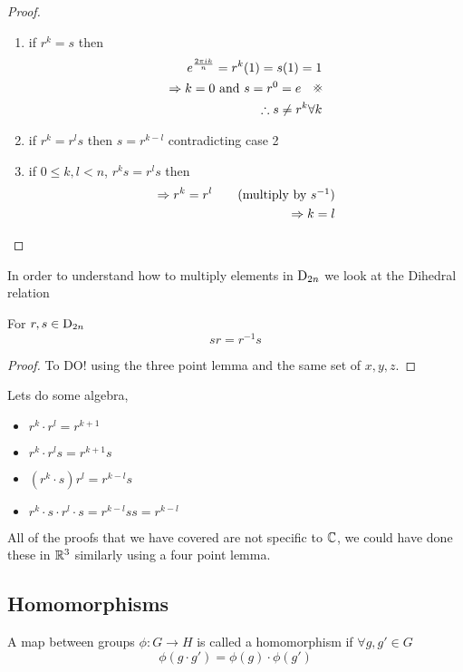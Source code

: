 \documentclass{article}
\begin{document}
\begin{proof}
\begin{enumerate}[cases]
        \item if $r^k = s$ then
        \begin{align*}
            e^\frac{2\pi i k}{n} = r^k(1) = s(1) = 1 \\
            \Rightarrow k = 0 \ \text{and} \ s = r^0 = e \quad \contradiction \\
            \therefore s \neq r^k \forall k
        \end{align*}

        \item if $r^k = r^ls$ then $s = r^{k-l}$ contradicting case 2
        \item if $0 \leq k, l < n$, $r^ks = r^ls$ then
        \begin{align*}
            \Rightarrow r^k = r^l \tag{multiply by $s^{-1}$} \\
            \Rightarrow k = l
        \end{align*}
    \end{enumerate}
\end{proof}

In order to understand how to multiply elements in $\mathrm{D}_{2n}$ we look at the Dihedral relation
\begin{lemma}
    For $r,s \in \mathrm{D}_{2n}$
    \[
        sr = r^{-1}s  
    \]
\end{lemma}

\begin{proof}
    To DO! using the three point lemma and the same set of ${x, y, z}$.
\end{proof}

\begin{eg}
    Lets do some algebra,
    \begin{itemize}
        \item $r^k \cdot r^l = r^{k + 1}$
        \item  $r^k \cdot r^ls = r^{k + 1}s$
        \item $(r^k \cdot s) r^l = r^{k - l}s$
        \item $r^k \cdot s \cdot r^l \cdot s= r^{k - l}ss = r^{k - l}$
    \end{itemize}
\end{eg}

All of the proofs that we have covered are not specific to $\mathbb{C}$, we could have done these in $\mathbb{R}^3$ similarly using a four point lemma.

\subsection{Homomorphisms}
\begin{defi}[Homomorphism]
    A map between groups $\phi: G \rightarrow H$ is called a homomorphism if $\forall g, g' \in G$
    \[
        \phi(g \cdot g') = \phi(g) \cdot \phi(g')  
    \]
\end{defi}
\end{document}
